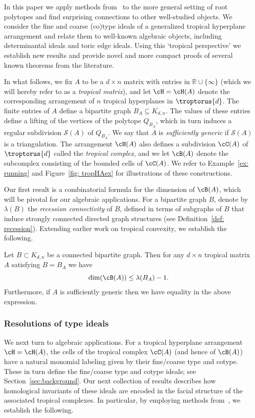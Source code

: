 In this paper we apply methods from~\cite{dochtermann2012tropical} to the more general setting of root polytopes and find surprising connections to other well-studied objects.  We consider the fine and coarse (co)type ideals of a generalized tropical hyperplane arrangement and relate them to well-known algebraic objects, including determinantal ideals and toric edge ideals.  Using this `tropical perspective' we establish new results and provide novel and more compact proofs of several known theorems from the literature.

In what follows, we fix $A$ to be a $d \times n$ matrix with entries in ${\mathbb R} \cup \{\infty\}$ (which we will hereby refer to as a \textit{tropical matrix}), and let $\cH = \cH(A)$  denote the corresponding arrangement of $n$ tropical hyperplanes in $\troptorus{d}$.  The finite entries of $A$ define a bipartite graph $B_A \subseteq K_{d,n}$. The values of these entries define a lifting of the vertices of the polytope $Q_{B_A}$, which in turn induces a regular subdivision ${\mathcal S}(A)$ of $Q_{B_A}$. We say that $A$ is \emph{sufficiently generic} if ${\mathcal S}(A)$ is a triangulation. The arrangement $\cH(A)$ also defines a subdivision $\cC(A)$ of  $\troptorus{d}$ called the \emph{tropical complex}, and we let $\cB(A)$ denote the subcomplex consisting of the bounded cells of $\cC(A)$.  We refer to Example~\ref{ex: running} and Figure~\ref{fig: tropHAex} for illustrations of these constructions.

Our first result is a combinatorial formula for the dimension of $\cB(A)$, which will be pivotal for our algebraic applications.  For a bipartite graph $B$, denote by $\lambda(B)$ the \emph{recession connectivity} of $B$, defined in terms of subgraphs of $B$ that induce strongly connected directed graph structures (see Definition~\ref{def: recession}).  Extending earlier work on tropical convexity, we establish the following. 

\begin{thm} \label{thm: dim}
Let $B \subset K_{d,n}$ be a connected bipartite graph. Then for any $d \times n$ tropical matrix $A$ satisfying $B = B_A$ we have  
\[\dim(\cB(A)) \leq \lambda(B_A) - 1.\]
Furthermore, if $A$ is sufficiently generic then we have equality in the above expression.
\end{thm}


\subsubsection{Resolutions of type ideals}
We next turn to algebraic applications. For a tropical hyperplane arrangement $\cH = \cH(A)$, the cells of the tropical complex $\cC(A)$ (and hence of $\cB(A)$) have a natural monomial labeling given by their fine/coarse type and cotype. These in turn define the fine/coarse type and cotype ideals; see Section~\ref{sec:background}. Our next collection of results describes how homological invariants of these ideals are encoded in the facial structure of the associated tropical complexes. In particular, by employing methods from~\cite{dochtermann2012tropical}, we establish the following.

